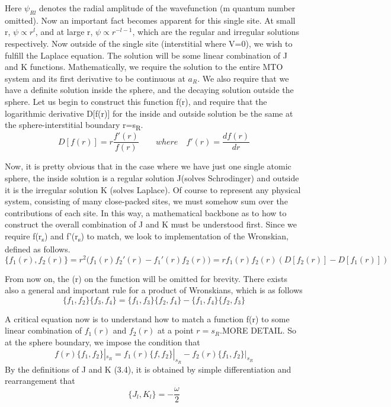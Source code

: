 \documentclass[12pt]{article}
\begin{document}
Here $\psi_{Rl}$ denotes the radial amplitude of the wavefunction (m quantum number omitted). Now an important fact becomes apparent for this single site. At small r, $\psi \propto r^l$, and at large r, $\psi \propto r^{-l-1}$, which are the regular and irregular solutions respectively. Now outside of the single site (interstitial where V=0), we wish to fulfill the Laplace equation. The solution will be some linear combination of J and K functions. Mathematically, we require the solution to the entire MTO system and its first derivative to be continuous at $a_R$. We also require that we have a definite solution inside the sphere, and the decaying solution outside the sphere. Let us begin to construct this function f(r), and require that the logarithmic derivative D[f(r)] for the inside and outside solution be the same at the sphere-interstitial boundary r=s\textsubscript{R}. 
\begin{equation} \label{3.6} \tag{3.6}
D[f(r)]= r \frac{f'(r)}{f(r)} \qquad where \quad f'(r)=\frac{df(r)}{dr}
\end{equation}

Now, it is pretty obvious that in the case where we have just one single atomic sphere, the inside solution is a regular solution J(solves Schrodinger) and outside it is the irregular solution K (solves Laplace). 
Of course to represent any physical system, consisting of many close-packed sites, we must somehow sum over the contributions of each site. In this way, a mathematical backbone as to how to construct the overall combination of J and K must be understood first.
Since we require f(r\textsubscript{s}) and f'(r\textsubscript{s}) to match, we look to implementation of the Wronskian, defined as follows.
\begin{equation} \label{3.6} \tag{3.6}
\{f_1(r),f_2(r)\}= r^2 \big(f_1(r)f_2'(r)-f_1'(r)f_2(r)\big)=rf_1(r)f_2(r) (D[f_2(r)]-D[f_1(r)])
\end{equation}

From now on, the (r) on the function will be omitted for brevity. There exists also a general and important rule for a product of Wronskians, which is as follows
\begin{equation} \label{3.7} \tag{3.7}
\{f_1,f_2\}\{f_3,f_4\}=\{f_1,f_3\}\{f_2,f_4\}-\{f_1,f_4\}\{f_2,f_3\}
\end{equation}

A critical equation now is to understand how to match a function f(r) to some linear combination of $f_1(r)$ and $f_2(r)$ at a point $r=s_R$.MORE DETAIL. So at the sphere boundary, we impose the condition that
\begin{equation} \label{3.8} \tag{3.8}
f(r)\{f_1,f_2\}|_{s_R}=f_1(r)\{f,f_2\}|_{s_R}-f_2(r)\{f_1,f_2\}|_{s_R}
\end{equation}
By the definitions of J and K (3.4), it is obtained by simple differentiation and rearrangement that 
\begin{equation} \label{3.9} \tag{3.9}
\{J_l,K_l\}=-\frac{\omega}{2}
\end{equation}
\end{document}
